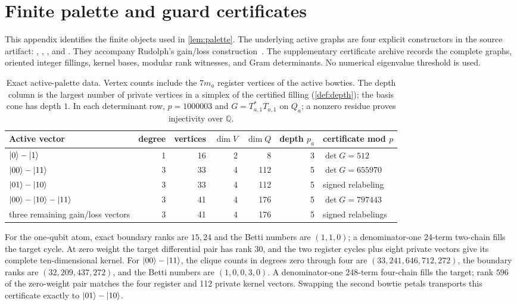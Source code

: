 \section{Finite palette and guard certificates}
\label{app:palette}

This appendix identifies the finite objects used in \cref{lem:palette}.  The
underlying active graphs are four explicit constructors in the source artifact:
, , , and
.  They accompany Rudolph's gain/loss
construction~\cite{rudolph2026universal}.
The supplementary certificate archive records the complete graphs, oriented
integer fillings, kernel bases, modular rank witnesses, and Gram determinants.
No numerical eigenvalue threshold is used.

\begin{table}[ht]
\centering
\begin{tabularx}{\linewidth}{@{}>{\raggedright\arraybackslash}Xrrrrr>{\raggedright\arraybackslash}X@{}}
\toprule
Active vector & degree & vertices & \(\dim V\) & \(\dim Q\) & depth \(p_a\) & certificate mod \(p\) \\
\midrule
\(\lvert 0\rangle-\lvert 1\rangle\) & 1 & 16 & 2 & 8 & 3 &
\(\det G=512\) \\
\(\lvert 00\rangle-\lvert 11\rangle\) & 3 & 33 & 4 & 112 & 5 &
\(\det G=655970\) \\
\(\lvert 01\rangle-\lvert 10\rangle\) & 3 & 33 & 4 & 112 & 5 &
signed relabeling \\
\(\lvert 00\rangle-\lvert 10\rangle-\lvert 11\rangle\) & 3 & 41 & 4 & 176 & 5 &
\(\det G=797443\) \\
three remaining gain/loss vectors & 3 & 41 & 4 & 176 & 5 &
signed relabelings \\
\bottomrule
\end{tabularx}
\caption{Exact active-palette data.  Vertex counts include the \(7m_a\)
register vertices of the active bowties.  The depth column is the largest
number of private vertices in a simplex of the certified filling
(\cref{def:depth}); the basis cone has depth \(1\).  In each determinant row,
\(p=1000003\) and \(G=T_{a,1}^*T_{a,1}\) on \(Q_a\); a nonzero residue
proves injectivity over \(\mathbb Q\).}
\label{tab:palette-certificates}
\end{table}

For the one-qubit atom, exact boundary ranks are \(15,24\) and the Betti
numbers are \((1,1,0)\); a denominator-one 24-term two-chain fills the target
cycle.  At zero weight the target differential pair has rank \(30\), and the
two register cycles plus eight private vectors give its complete
ten-dimensional kernel.  For \(\lvert 00\rangle-\lvert 11\rangle\), the clique counts in
degrees zero through four are
\((33,241,646,712,272)\), the boundary ranks are
\((32,209,437,272)\), and the Betti numbers are \((1,0,0,3,0)\).
A denominator-one 248-term four-chain fills the target; rank \(596\) of the
zero-weight pair matches the four register and 112 private kernel vectors.
Swapping the second bowtie petals transports this certificate exactly to
\(\lvert 01\rangle-\lvert 10\rangle\).

